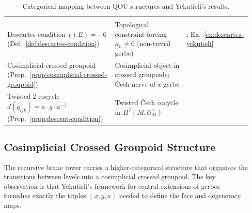 \begin{table}[ht]
\begin{tabular}{p{4.2cm}p{4.8cm}p{4.5cm}}
  & \cite[\S2]{yekutieli2008} \\[6pt]
Descartes condition $\chi(E) = -6$
  (Def.~\ref{def:descartes-condition})
  & Topological constraint forcing $\kappa_n \neq 0$ (non-trivial gerbe)
  & \cite{yekutieli2010}; Ex.~\ref{ex:descartes-yekutieli} \\[6pt]
Cosimplicial crossed groupoid
  (Prop.~\ref{prop:cosimplicial-crossed-groupoid})
  & Cosimplicial object in crossed groupoids; \v{C}ech nerve of a gerbe
  & \cite[\S1--2]{yekutieli2010} \\[6pt]
Twisted $2$-cocycle $d(g_{ijk}) = a \cdot g \cdot a^{-1}$
  (Prop.~\ref{prop:descent-condition})
  & Twisted \v{C}ech cocycle in $H^2(M, \mathcal{O}_M^\times)$
  & \cite[Thm.~1.7]{yekutieli2010} \\
\hline
\end{tabular}
\caption{Categorical mapping between QOU structures and Yekutieli's results.}
\label{tab:yekutieli-mapping}
\end{table}


\subsection{Cosimplicial Crossed Groupoid Structure}
\label{ssec:cosimplicial-crossed-groupoid}

The recursive brane tower carries a higher-categorical structure that
organises the transitions between levels into a cosimplicial crossed
groupoid.  The key observation is that Yekutieli's framework for central
extensions of gerbes~\cite{yekutieli2010} furnishes exactly the triples
$(x, g, a)$ needed to define the face and degeneracy maps.

